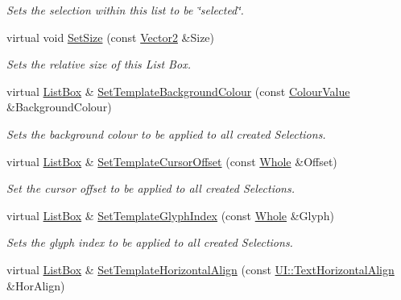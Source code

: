 \begin{DoxyCompactItemize}
\begin{DoxyCompactList}\small\item\em Sets the selection within this list to be \char`\"{}selected\char`\"{}. \item\end{DoxyCompactList}\item 
virtual void \hyperlink{classMezzanine_1_1UI_1_1ListBox_a69058a4d45eeb28da12993d17a878ce2}{SetSize} (const \hyperlink{classMezzanine_1_1Vector2}{Vector2} \&Size)
\begin{DoxyCompactList}\small\item\em Sets the relative size of this List Box. \item\end{DoxyCompactList}\item 
virtual \hyperlink{classMezzanine_1_1UI_1_1ListBox}{ListBox} \& \hyperlink{classMezzanine_1_1UI_1_1ListBox_a1a2f8bd297f505c405ae80cff0d0ce22}{SetTemplateBackgroundColour} (const \hyperlink{classMezzanine_1_1ColourValue}{ColourValue} \&BackgroundColour)
\begin{DoxyCompactList}\small\item\em Sets the background colour to be applied to all created Selections. \item\end{DoxyCompactList}\item 
virtual \hyperlink{classMezzanine_1_1UI_1_1ListBox}{ListBox} \& \hyperlink{classMezzanine_1_1UI_1_1ListBox_a2ce73aa7cca0365ef052de34b387fb8f}{SetTemplateCursorOffset} (const \hyperlink{namespaceMezzanine_adcbb6ce6d1eb4379d109e51171e2e493}{Whole} \&Offset)
\begin{DoxyCompactList}\small\item\em Set the cursor offset to be applied to all created Selections. \item\end{DoxyCompactList}\item 
virtual \hyperlink{classMezzanine_1_1UI_1_1ListBox}{ListBox} \& \hyperlink{classMezzanine_1_1UI_1_1ListBox_a7aaf12f4ac3d15f059761646fc111b48}{SetTemplateGlyphIndex} (const \hyperlink{namespaceMezzanine_adcbb6ce6d1eb4379d109e51171e2e493}{Whole} \&Glyph)
\begin{DoxyCompactList}\small\item\em Sets the glyph index to be applied to all created Selections. \item\end{DoxyCompactList}\item 
virtual \hyperlink{classMezzanine_1_1UI_1_1ListBox}{ListBox} \& \hyperlink{classMezzanine_1_1UI_1_1ListBox_afcbed87ee667512e55b6bb4249582189}{SetTemplateHorizontalAlign} (const \hyperlink{namespaceMezzanine_1_1UI_aebbd46e62bb20d958f1915c1ec6cc549}{UI::TextHorizontalAlign} \&HorAlign)

\end{DoxyCompactItemize}
